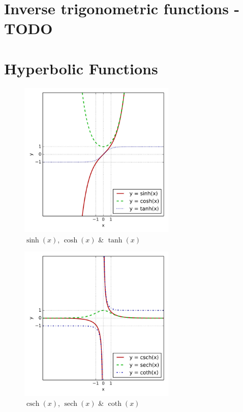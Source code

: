 \section{Inverse trigonometric functions - TODO \cite{wiki-Inverse_trigonometric_functions}}\label{Inverse trigonometric functions}

\section{Hyperbolic Functions \cite{wiki-Hyperbolic_functions}}\label{Hyperbolic_functions}
\newcommand{\sech}{\operatorname{sech}}
\newcommand{\csch}{\operatorname{csch}}

\begin{table}[H]
    \centering
    \begin{minipage}[t]{0.45\linewidth}
        \begin{figure}[H]
            \centering
            \includegraphics[height=7.5cm]{Pictures/maths/Sinh_cosh_tanh.jpg}
            \caption{$\sinh(x)$, $\cosh(x)$ \& $\tanh(x)$}
        \end{figure}        
    \end{minipage}
    \hfill
    \begin{minipage}[t]{0.45\linewidth}
        \begin{figure}[H]
            \centering
            \includegraphics[height=7.5cm]{Pictures/maths/Csch_sech_coth.jpg}
            \caption{$\csch(x)$, $\sech(x)$ \& $\coth(x)$}
        \end{figure}
    \end{minipage}
\end{table}

